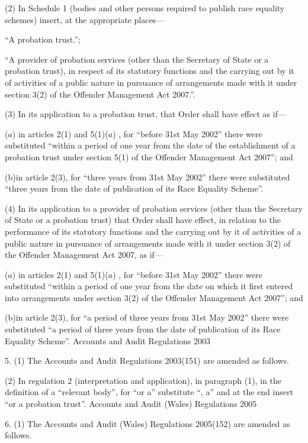 \documentclass[12pt,a4paper]{article}
\begin{document}
(2) In Schedule 1 (bodies and other persons required to publish race equality schemes) insert, at the appropriate places—

“A probation trust.”;

“A provider of probation services (other than the Secretary of State or a probation trust), in respect of its statutory functions and the carrying out by it of activities of a public nature in pursuance of arrangements made with it under section 3(2) of the Offender Management Act 2007.”.

(3) In its application to a probation trust, that Order shall have effect as if—

($a$) in articles 2(1) and 5(1)($a$) , for “before 31st May 2002” there were substituted “within a period of one year from the date of the establishment of a probation trust under section 5(1) of the Offender Management Act 2007”; and

(b)in article 2(3), for “three years from 31st May 2002” there were substituted “three years from the date of publication of its Race Equality Scheme”.

(4) In its application to a provider of probation services (other than the Secretary of State or a probation trust) that Order shall have effect, in relation to the performance of its statutory functions and the carrying out by it of activities of a public nature in pursuance of arrangements made with it under section 3(2) of the Offender Management Act 2007, as if—

($a$) in articles 2(1) and 5(1)($a$) , for “before 31st May 2002” there were substituted “within a period of one year from the date on which it first entered into arrangements under section 3(2) of the Offender Management Act 2007”; and

(b)in article 2(3), for “a period of three years from 31st May 2002” there were substituted “a period of three years from the date of publication of its Race Equality Scheme”.
Accounts and Audit Regulations 2003

5.  (1)  The Accounts and Audit Regulations 2003(151) are amended as follows.

(2) In regulation 2 (interpretation and application), in paragraph (1), in the definition of a “relevant body”, for “or a” substitute “, a” and at the end insert “or a probation trust”.
Accounts and Audit (Wales) Regulations 2005

6.  (1)  The Accounts and Audit (Wales) Regulations 2005(152) are amended as follows.
\end{document}
